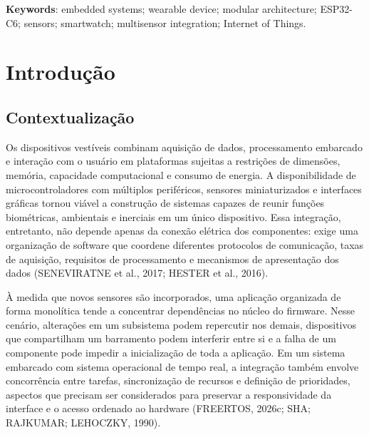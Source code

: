 \documentclass[a4paper,12pt]{article}
\newcommand{\listadequadros}{\listof{quadro}{Lista de quadros}}
\begin{document}
\noindent\textbf{Keywords}: embedded systems; wearable device; modular
architecture; ESP32-C6; sensors; smartwatch; multisensor integration;
Internet of Things.

\clearpage
\listoffigures
{}

\clearpage
\listoftables
{}

\clearpage
\listadequadros
{}

\clearpage
\tableofcontents

\clearpage
{}
\setcounter{page}{1}

\section{Introdu\c{c}\~ao}

\subsection{Contextualiza\c{c}\~ao}

Os dispositivos vest\'iveis combinam aquisi\c{c}\~ao de dados, processamento embarcado e intera\c{c}\~ao com o usu\'ario em plataformas sujeitas a restri\c{c}\~oes de dimens\~oes, mem\'oria, capacidade computacional e consumo de energia. A disponibilidade de microcontroladores com m\'ultiplos perif\'ericos, sensores miniaturizados e interfaces gr\'aficas tornou vi\'avel a constru\c{c}\~ao de sistemas capazes de reunir fun\c{c}\~oes biom\'etricas, ambientais e inerciais em um \'unico dispositivo. Essa integra\c{c}\~ao, entretanto, n\~ao depende apenas da conex\~ao el\'etrica dos componentes: exige uma organiza\c{c}\~ao de software que coordene diferentes protocolos de comunica\c{c}\~ao, taxas de aquisi\c{c}\~ao, requisitos de processamento e mecanismos de apresenta\c{c}\~ao dos dados (SENEVIRATNE et al., 2017; HESTER et al., 2016).

\`A medida que novos sensores s\~ao incorporados, uma aplica\c{c}\~ao organizada de forma monol\'itica tende a concentrar depend\^encias no n\'ucleo do firmware. Nesse cen\'ario, altera\c{c}\~oes em um subsistema podem repercutir nos demais, dispositivos que compartilham um barramento podem interferir entre si e a falha de um componente pode impedir a inicializa\c{c}\~ao de toda a aplica\c{c}\~ao. Em um sistema embarcado com sistema operacional de tempo real, a integra\c{c}\~ao tamb\'em envolve concorr\^encia entre tarefas, sincroniza\c{c}\~ao de recursos e defini\c{c}\~ao de prioridades, aspectos que precisam ser considerados para preservar a responsividade da interface e o acesso ordenado ao hardware (FREERTOS, 2026c; SHA; RAJKUMAR; LEHOCZKY, 1990).
\end{document}
